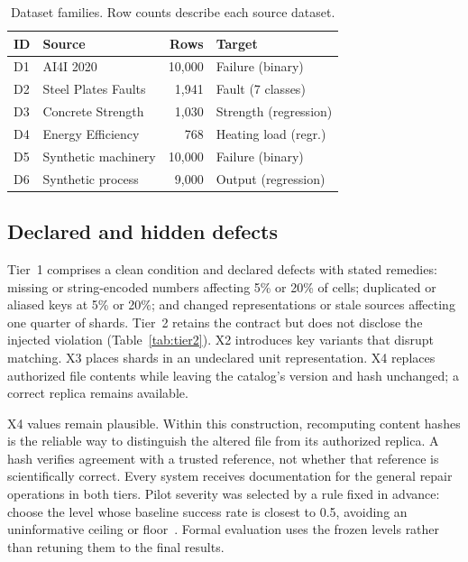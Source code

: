\documentclass[conference]{IEEEtran}
\begin{document}
\begin{table}[t]
\caption{Dataset families. Row counts describe each source dataset.}
\label{tab:data}
\centering\footnotesize\setlength{\tabcolsep}{4pt}
\begin{tabular}{@{}llrl@{}}
\toprule
ID & Source & Rows & Target \\
\midrule
D1 & AI4I 2020~\cite{uci601ai4i} & 10,000 & Failure (binary) \\
D2 & Steel Plates Faults~\cite{uci198steel} & 1,941 & Fault (7 classes) \\
D3 & Concrete Strength~\cite{uci165concrete,yeh1998concrete} & 1,030 & Strength (regression) \\
D4 & Energy Efficiency~\cite{uci242energy} & 768 & Heating load (regr.) \\
D5 & Synthetic machinery & 10,000 & Failure (binary) \\
D6 & Synthetic process & 9,000 & Output (regression) \\
\bottomrule
\end{tabular}
\end{table}

\subsection{Declared and hidden defects}
Tier~1 comprises a clean condition and declared defects with stated remedies: missing or string-encoded numbers affecting 5\% or 20\% of cells; duplicated or aliased keys at 5\% or 20\%; and changed representations or stale sources affecting one quarter of shards. Tier~2 retains the contract but does not disclose the injected violation (Table~\ref{tab:tier2}). X2 introduces key variants that disrupt matching. X3 places shards in an undeclared unit representation. X4 replaces authorized file contents while leaving the catalog's version and hash unchanged; a correct replica remains available.

X4 values remain plausible. Within this construction, recomputing content hashes is the reliable way to distinguish the altered file from its authorized replica. A hash verifies agreement with a trusted reference, not whether that reference is scientifically correct. Every system receives documentation for the general repair operations in both tiers. Pilot severity was selected by a rule fixed in advance: choose the level whose baseline success rate is closest to 0.5, avoiding an uninformative ceiling or floor~\cite{wang2026dbe}. Formal evaluation uses the frozen levels rather than retuning them to the final results.
\end{document}
